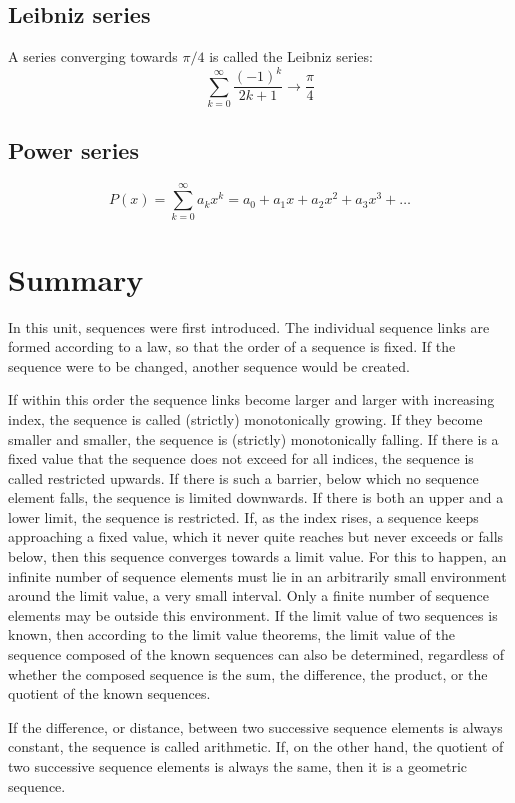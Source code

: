 \documentclass{book}
\begin{document}
\subsection{Leibniz series}
A series converging towards $\pi/4$ is called the Leibniz series:
\[
  \sum_{k=0}^{\infty}\frac{(-1)^k}{2k+1}\to\frac{\pi}{4}
\]

\subsection{Power series}
\[
  P(x) = \sum_{k=0}^{\infty}a_{k}x^{k}=a_0+a_1x+a_2x^2+a_3x^3+\dots
\]

\section{Summary}
In this unit, sequences were first introduced. The individual sequence links are formed according to a law, so that the order of a sequence is fixed. If the sequence were to be changed, another sequence would be created.

If within this order the sequence links become larger and larger with increasing index, the sequence is called (strictly) monotonically growing. If they become smaller and smaller, the sequence is (strictly) monotonically falling. If there is a fixed value that the sequence does not exceed for all indices, the sequence is called restricted upwards. If there is such a barrier, below which no sequence element falls, the sequence is limited downwards. If there is both an upper and a lower limit, the sequence is restricted. If, as the index rises, a sequence keeps approaching a fixed value, which it never quite reaches but never exceeds or falls below, then this sequence converges towards a limit value. For this to happen, an infinite number of sequence elements must lie in an arbitrarily small environment around the limit value, a very small interval. Only a finite number of sequence elements may be outside this environment. If the limit value of two sequences is known, then according to the limit value theorems, the limit value of the sequence composed of the known sequences can also be determined, regardless of whether the composed sequence is the sum, the difference, the product, or the quotient of the known sequences.

If the difference, or distance, between two successive sequence elements is always constant, the sequence is called arithmetic. If, on the other hand, the quotient of two successive sequence elements is always the same, then it is a geometric sequence.
\end{document}
